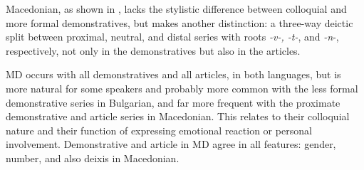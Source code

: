 \documentclass[output=paper,
colorlinks,
citecolor=brown,
newtxmath
]{langscibook}
\begin{document}

Macedonian, as shown in , lacks the stylistic difference between colloquial and more formal demonstratives, but makes another distinction: a three-way deictic split between proximal, neutral, and distal series with roots \textit{-v-, -t-}, and \textit{-n}-, respectively, not only in the demonstratives but also in the articles.

MD occurs with all demonstratives and all articles, in both languages, but is more natural for some speakers and probably more common with the less formal demonstrative series in Bulgarian, and far more frequent with the proximate demonstrative and article series in Macedonian. This relates to their colloquial nature and their function of expressing emotional reaction or personal involvement. Demonstrative and article in MD agree in all features: gender, number, and also deixis in Macedonian.
\end{document}
